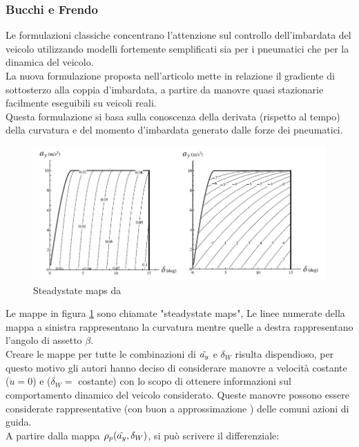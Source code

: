 \subsubsection{Bucchi e Frendo}

Le formulazioni classiche concentrano l'attenzione sul controllo dell'imbardata del veicolo utilizzando modelli fortemente
semplificati sia per i pneumatici che per la dinamica del veicolo.\\
La nuova formulazione proposta nell'articolo \cite{doi:10.1080/00423114.2016.1167225} mette in relazione  il gradiente di
sottosterzo alla coppia d'imbardata, a partire da manovre quasi stazionarie facilmente eseguibili su veicoli reali.\\
Questa formulazione si basa sulla conoscenza della derivata (rispetto al tempo) della curvatura e del momento d'imbardata
generato dalle forze dei pneumatici.\\
\begin{figure}[!h]
    \centering
    \includegraphics[scale=0.8]{Immagini/Understeer Gradient/Steadystate maps.jpg}
    \caption{Steadystate maps da \cite{guiggiani2018science}}
    \label{fig:Steadystate maps}
\end{figure}
Le mappe in figura \ref{fig:Steadystate maps} sono chiamate "steadystate maps", Le linee numerate
della mappa a sinistra rappresentano la curvatura mentre quelle a destra rappresentano l'angolo di
assetto $\beta$.\\
Creare le mappe per tutte le combinazioni di $\Tilde{a_y}$ e $\delta_W$ risulta dispendioso, per
questo motivo gli autori hanno deciso di considerare manovre a velocità costante ($\dot{u} = 0$) e 
($\dot{\delta_W} =$ costante) con lo scopo di ottenere informazioni sul comportamento dinamico del
veicolo considerato. Queste manovre possono essere considerate rappresentative (con buon
a approssimazione ) delle comuni azioni di guida.\\
A partire dalla mappa $\rho_p(\Tilde{a_y}, \delta_W)$, si può scrivere il differenziale:

